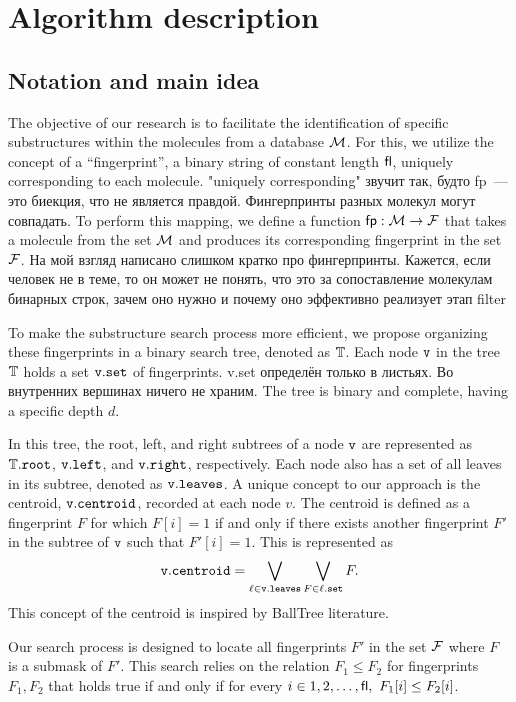 \section{Algorithm description}

\subsection{Notation and main idea}
The objective of our research is to facilitate the identification of specific substructures within the molecules from a database $\mathcal{M}$. For this, we utilize the concept of a ``fingerprint'', a binary string of constant length ${\sf fl}$, uniquely corresponding to each molecule.
{\color{red} "uniquely corresponding" звучит так, будто fp~--- это биекция, что не является правдой. Фингерпринты разных молекул могут совпадать. } To perform this mapping, we define a function ${\sf fp}: \mathcal{M} \to \mathcal{F}$ that takes a molecule from the set $\mathcal{M}$ and produces its corresponding fingerprint in the set $\mathcal{F}$. {\color{red} На мой взгляд написано слишком кратко про фингерпринты. Кажется, если человек не в теме, то он может не понять, что это за сопоставление молекулам бинарных строк, зачем оно нужно и почему оно эффективно реализует этап filter}

To make the substructure search process more efficient, we propose organizing these fingerprints in a binary search tree, denoted as $\mathbb{T}$. Each node $\tt{v}$ in the tree $\mathbb{T}$ holds a set $\tt{v.set}$ of fingerprints. {\color{red} v.set определён только в листьях. Во внутренних вершинах ничего не храним.} The tree is binary and complete, having a specific depth $d$.

In this tree, the root, left, and right subtrees of a node $\tt{v}$ are represented as $\mathbb{T}.\tt{root}$, $\tt{v.left}$, and $\tt{v.right}$, respectively. Each node also has a set of all leaves in its subtree, denoted as $\tt{v.leaves}$. A unique concept to our approach is the centroid, ${\tt v.centroid}$, recorded at each node $v$. The centroid is defined as a fingerprint $F$ for which $F[i] = 1$ if and only if there exists another fingerprint $F'$ in the subtree of $\tt{v}$ such that $F'[i] = 1$. This is represented as
$${\tt v.centroid} = \bigvee\limits_{\ell \in {\tt v.leaves}}\bigvee\limits_{F \in \ell.{\tt set}} F.$$ 
This concept of the centroid is inspired by BallTree literature.

Our search process is designed to locate all fingerprints $F'$ in the set $\mathcal{F}$ where $F$ is a submask of $F'$. This search relies on the relation $F_1 \le F_2$ for fingerprints $F_1, F_2$ that holds true if and only if for every $i \in {1, 2, \ldots, {\sf fl}}, \ F_1[i] \le F_2[i]$. 

